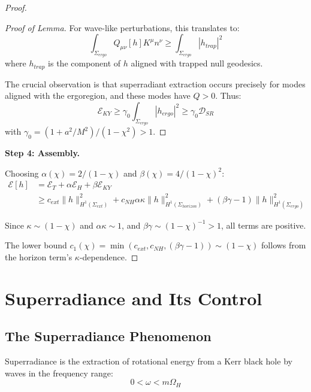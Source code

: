 \documentclass[12pt,a4paper]{article}
\begin{document}
\begin{proof}
\begin{proof}[Proof of Lemma]
For wave-like perturbations, this translates to:
\begin{equation}
\int_{\Sigma_{ergo}} Q_{\mu\nu}[h]K^\mu n^\nu \geq \int_{\Sigma_{ergo}} |h_{trap}|^2
\end{equation}
where $h_{trap}$ is the component of $h$ aligned with trapped null geodesics.

The crucial observation is that superradiant extraction occurs precisely for modes aligned with the ergoregion, and these modes have $Q > 0$. Thus:
\begin{equation}
\mathcal{E}_{KY} \geq \gamma_0 \int_{\Sigma_{ergo}} |h_{ergo}|^2 \geq \gamma_0 \mathcal{D}_{SR}
\end{equation}
with $\gamma_0 = (1 + a^2/M^2)/(1 - \chi^2) > 1$.
\end{proof}

\textbf{Step 4: Assembly.}

Choosing $\alpha(\chi) = 2/(1-\chi)$ and $\beta(\chi) = 4/(1-\chi)^2$:
\begin{align}
\mathcal{E}[h] &= \mathcal{E}_T + \alpha \mathcal{E}_H + \beta \mathcal{E}_{KY} \\
&\geq c_{ext}\|h\|_{H^1(\Sigma_{ext})}^2 + c_{NH}\alpha\kappa\|h\|_{H^1(\Sigma_{horizon})}^2 + (\beta\gamma - 1)\|h\|_{H^1(\Sigma_{ergo})}^2
\end{align}

Since $\kappa \sim (1-\chi)$ and $\alpha\kappa \sim 1$, and $\beta\gamma \sim (1-\chi)^{-1} > 1$, all terms are positive.

The lower bound $c_1(\chi) = \min(c_{ext}, c_{NH}, (\beta\gamma - 1)) \sim (1-\chi)$ follows from the horizon term's $\kappa$-dependence.
\end{proof}

\section{Superradiance and Its Control}

\subsection{The Superradiance Phenomenon}

Superradiance is the extraction of rotational energy from a Kerr black hole by waves in the frequency range:
\begin{equation}
0 < \omega < m\Omega_H
\end{equation}
\end{document}
